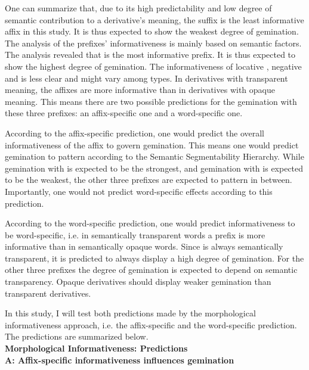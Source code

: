 {One can summarize that, due to its high predictability and low degree of semantic contribution to a derivative's meaning, the suffix  is the least informative affix in this study. It is thus expected to show the weakest degree of gemination. 
The analysis of the prefixes' informativeness is mainly based on semantic factors. 
The analysis revealed that  is the most informative prefix. It is thus expected to show the highest degree of gemination. 
The informativeness of locative , negative  and  is less clear and might vary among types. In derivatives with transparent meaning, the affixes are more informative than in derivatives with opaque meaning. This means there are two possible predictions for the gemination with these three prefixes: an affix-specific one and a word-specific one. 

According to the affix-specific prediction, one would predict the overall informativeness of the affix to govern gemination. This means one would predict gemination to pattern according to the Semantic Segmentability Hierarchy. While gemination with  is expected to be the strongest, and gemination with  is expected to be the weakest, the other three prefixes are expected to pattern in between. Importantly, one would not predict word-specific effects according to this prediction. 

According to the word-specific prediction, one would predict informativeness to be word-specific, i.e. in semantically transparent words a prefix is more informative than in semantically opaque words. Since  is always semantically transparent, it is predicted to always display a high degree of gemination. For the other three prefixes the degree of gemination is expected to depend on semantic transparency. Opaque derivatives should display weaker gemination than transparent derivatives. 

In this study, I will test both predictions made by the morphological informativeness approach, i.e. the affix-specific and the word-specific prediction. The predictions are summarized below.\\


\noindent \textbf{Morphological Informativeness: Predictions}\\	

\noindent 	\textbf{A:\hspace{0.5cm} Affix-specific informativeness influences gemination}\vspace{0.2 cm}
	
}
